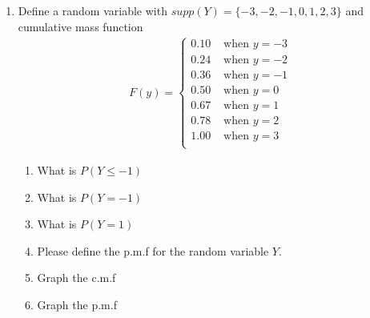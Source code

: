 \begin{enumerate}
    \item Define a random variable with $supp(Y) = \{-3,-2,-1,0,1,2,3\}$ and cumulative mass function 
    \begin{align*}
        F(y) = \begin{cases}
                  0.10  & \text{ when } y = -3\\
                  0.24  & \text{ when } y = -2\\
                  0.36  & \text{ when } y = -1\\
                  0.50  & \text{ when } y =  0\\
                  0.67  & \text{ when } y =  1\\
                  0.78  & \text{ when } y =  2\\
                  1.00  & \text{ when } y =  3\\
               \end{cases}
    \end{align*} 
    \begin{enumerate}
        \item What is $P(Y \leq -1)$
        \item What is $P(Y=-1)$
        \item What is $P(Y= 1)$
        \item Please define the p.m.f for the random variable $Y$.
        \item Graph the c.m.f
        \item Graph the p.m.f
    \end{enumerate}


\end{enumerate}

